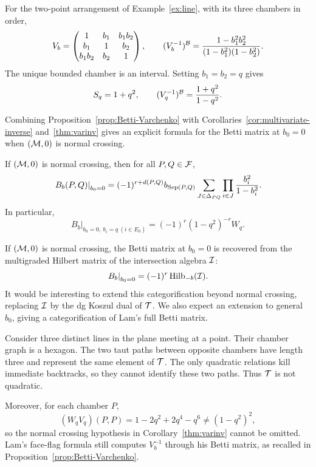 \begin{example}\label{ex:two-points}
For the two-point arrangement of Example~\ref{ex:line},
with its three chambers in order,
\[
 V_b=\begin{pmatrix}
  1&b_1&b_1b_2\\ b_1&1&b_2\\ b_1b_2&b_2&1
 \end{pmatrix},\qquad
 (V_b^{-1})^{\mathcal B}
 =\frac{1-b_1^2b_2^2}{(1-b_1^2)(1-b_2^2)}.
\]
The unique bounded chamber is an interval. Setting $b_1=b_2=q$ gives
\[
 S_q=1+q^2,\qquad
 (V_q^{-1})^{\mathcal B}=\frac{1+q^2}{1-q^2}.
\]
\end{example}

Combining Proposition~\ref{prop:Betti-Varchenko} with
Corollaries~\ref{cor:multivariate-inverse} and~\ref{thm:varinv} gives
an explicit formula for the Betti matrix at $b_0=0$ when $(\mathcal M,0)$
is normal crossing.

\begin{corollary}\label{cor:Betti-entries}
If $(\mathcal M,0)$ is normal crossing, then for all $P,Q\in\mathcal F$,
\[
 \left.B_b(P,Q)\right|_{b_0=0}
 =(-1)^{r+d(P,Q)}b_{\operatorname{Sep}(P,Q)}
   \sum_{J\in\Delta_{PQ}}\prod_{i\in J}\frac{b_i^2}{1-b_i^2}.
\]
In particular,
\[
 \left.B_b\right|_{b_0=0,\ b_i=q\ (i\in E_0)}
 =(-1)^r(1-q^2)^{-r}W_q.
\]
\end{corollary}

\begin{remark}
If $(\mathcal M,0)$ is normal crossing, the Betti matrix at $b_0=0$ is recovered from
the multigraded Hilbert matrix of the intersection algebra $\mathcal I$:
\[
 \left.B_b\right|_{b_0=0}=(-1)^r\operatorname{Hilb}_{-b}(\mathcal I).
\]
It would be interesting to extend this categorification beyond normal
crossing, replacing $\mathcal I$ by the dg Koszul dual of $\mathcal T$.
We also expect an extension to general $b_0$, giving a categorification
of Lam's full Betti matrix.
\end{remark}


\begin{remark}\label{ex:concurrent-lines}
Consider three distinct lines in the plane meeting at a point.
Their chamber graph is a hexagon. The two taut paths between
opposite chambers have length three and represent the same element
of $\mathcal T$. The only quadratic relations kill immediate backtracks,
so they cannot identify these two paths. Thus $\mathcal T$ is not quadratic.

Moreover, for each chamber $P$,
\[
 (W_qV_q)(P,P)=1-2q^2+2q^4-q^6\ne(1-q^2)^2,
\]
so the normal crossing hypothesis in Corollary~\ref{thm:varinv}
cannot be omitted. Lam's face-flag formula still computes $V_b^{-1}$
through his Betti matrix, as recalled in
Proposition~\ref{prop:Betti-Varchenko}.
\end{remark}

